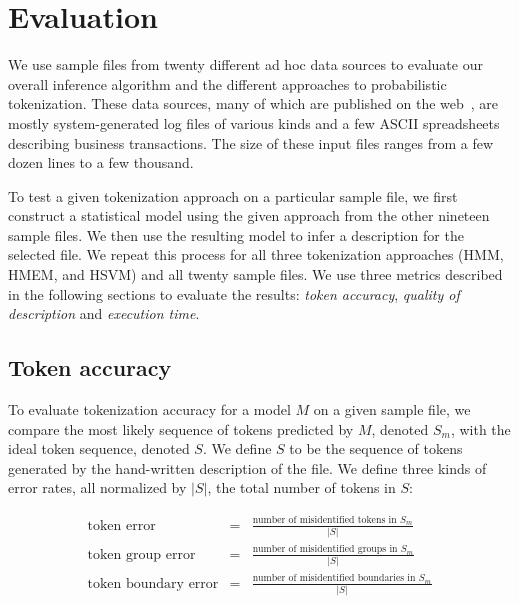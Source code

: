 \section{Evaluation}\label{sec:eval}
We use sample files from twenty different ad hoc data sources to
evaluate our overall inference algorithm and the different
approaches to probabilistic tokenization.
These data sources, many of which are published on the
web~\cite{padsweb}, are mostly system-generated log files of various
kinds and a few ASCII spreadsheets describing business transactions.
The size of these input files ranges from a few dozen lines to a few
thousand.

To test a given tokenization approach on a particular sample file, we
first construct a statistical model using the given approach from the
other nineteen sample files.  We then use the resulting model to infer a
description for the selected file.  We repeat this process for all
three tokenization approaches (HMM, HMEM, and HSVM) and all twenty
sample files.  We use three metrics described in the following
sections to evaluate the results: {\em token accuracy},
{\em quality of description} and {\em execution time}.

\subsection{Token accuracy}
To evaluate tokenization accuracy for a model $M$ on a given sample
file, we compare the most likely sequence of tokens predicted by $M$,
denoted $S_m$, with the ideal token sequence, denoted $S$.  We define
$S$ to be the sequence of tokens generated by the hand-written \pads{}
description of the file.  We define three kinds of error rates, all
normalized by $|S|$, the total number of tokens in $S$:

\begin{eqnarray*}
\textrm{token error} & = & \frac{\textrm{number of misidentified tokens in $S_m$}}
    {|S|} \\[1ex]
\textrm{token group error} & = & \frac{\textrm{number of misidentified groups in $S_m$}}
    {|S|}\\[1ex]
\textrm{token boundary error} & = & \frac{\textrm{number of misidentified boundaries in $S_m$}}
    {|S|}
\end{eqnarray*}

